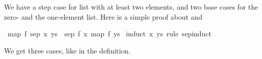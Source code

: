 \begin{isabellebody}
\begin{isamarkuptext}
  We have a step case for list with at least two elements, and two
  base cases for the zero- and the one-element list. Here is a simple
  proof about  and %
\end{isamarkuptext}%
\isamarkuptrue%
\isamarkupfalse%
\ {}map\ f\ {}sep\ x\ ys{}\ {}\ sep\ {}f\ x{}\ {}map\ f\ ys{}{}\isanewline
%
\isadelimproof
%
\endisadelimproof
%
\isatagproof
{}\isamarkupfalse%
\ {}induct\ x\ ys\ rule{}\ sep{}induct{}%
\begin{isamarkuptxt}%
We get three cases, like in the definition.


\end{isamarkuptxt}
\end{isabellebody}
